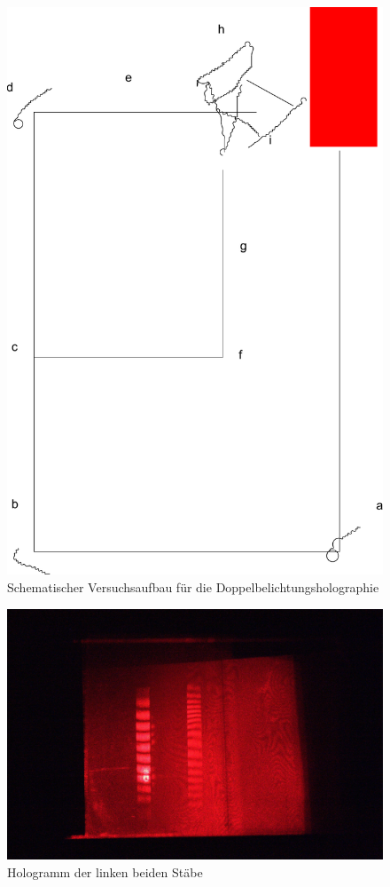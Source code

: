 \begin{figure}[H]
 \includegraphics[height=0.5\textheight]{BilderAufbau/doppelbelichtung.pdf}
 \caption{Schematischer Versuchsaufbau für die Doppelbelichtungsholographie}
 \label{doppelbelichtung-aufbau}
\end{figure}


\begin{figure}[H]
 \includegraphics[width=\textwidth]{Photos/IMG_3909.jpg}
 \caption{Hologramm der linken beiden Stäbe}
 \label{doppelbelichtung-links}
\end{figure}


